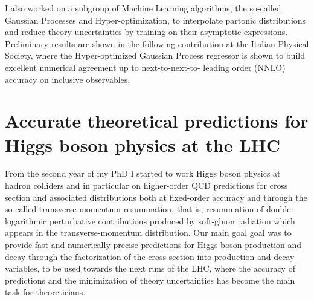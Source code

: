 \documentclass[12pt]{article}
\begin{document}
I also worked on a subgroup of Machine Learning algorithms, the so-called Gaussian Processes and Hyper-optimization, to interpolate partonic distributions and reduce theory uncertainties by training on their asymptotic expressions. Preliminary results are shown in the following contribution at the Italian Physical Society, where the Hyper-optimized Gaussian Process regressor is shown to build excellent numerical agreement up to next-to-next-to- leading order (NNLO) accuracy on inclusive observables.

\section{Accurate theoretical predictions for Higgs boson physics at the LHC}

From the second year of my PhD I started to work Higgs boson physics at hadron colliders
and in particular on higher-order QCD predictions for cross section and
associated distributions both at fixed-order accuracy and through the so-called
transverse-momentum resummation, that is, resummation of double-logarithmic perturbative contributions produced by soft-gluon radiation which appears in the transverse-momentum distribution.
Our main goal goal was to provide fast and numerically precise predictions for Higgs boson production and decay
through the factorization of the cross section into production and decay variables, to be used towards the next
runs of the LHC, where the accuracy of predictions and the minimization of theory uncertainties has become the main task for theoreticians. \\
\end{document}
